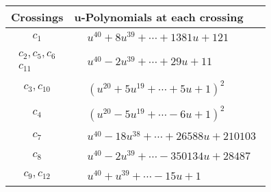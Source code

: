 \documentclass[1p]{elsarticle_modified}
\theoremstyle{definition}
\begin{document}
\begin{tabular}{m{50pt}|m{274pt}}
Crossings & \hspace{64pt}u-Polynomials at each crossing \\
\hline $$\begin{aligned}c_{1}\end{aligned}$$&$\begin{aligned}
&u^{40}+8 u^{39}+\cdots+1381 u+121
\end{aligned}$\\
\hline $$\begin{aligned}c_{2},c_{5},c_{6}\\c_{11}\end{aligned}$$&$\begin{aligned}
&u^{40}-2 u^{39}+\cdots+29 u+11
\end{aligned}$\\
\hline $$\begin{aligned}c_{3},c_{10}\end{aligned}$$&$\begin{aligned}
&(u^{20}+5 u^{19}+\cdots+5 u+1)^{2}
\end{aligned}$\\
\hline $$\begin{aligned}c_{4}\end{aligned}$$&$\begin{aligned}
&(u^{20}-5 u^{19}+\cdots-6 u+1)^{2}
\end{aligned}$\\
\hline $$\begin{aligned}c_{7}\end{aligned}$$&$\begin{aligned}
&u^{40}-18 u^{38}+\cdots+26588 u+210103
\end{aligned}$\\
\hline $$\begin{aligned}c_{8}\end{aligned}$$&$\begin{aligned}
&u^{40}-2 u^{39}+\cdots-350134 u+28487
\end{aligned}$\\
\hline $$\begin{aligned}c_{9},c_{12}\end{aligned}$$&$\begin{aligned}
&u^{40}+u^{39}+\cdots-15 u+1
\end{aligned}$\\
\hline
\end{tabular}\\~\\
\end{document}
